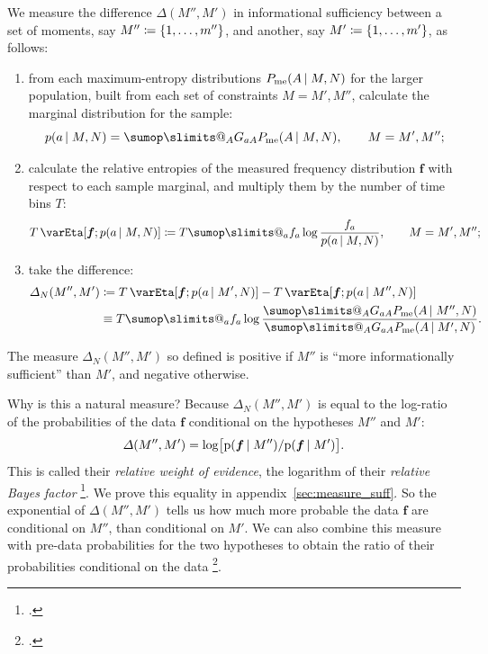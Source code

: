 \documentclass[\ifafour a4paper,12pt,\else a5paper,10pt,\fi%
onecolumn,oneside,article,%
british%
]{memoir}
\makeatletter
\theoremstyle{remark}
\theoremstyle{innote}
\def\sum{\DOTSI\sumop\slimits@}
\newcommand*{\citep}{\footcites}
\newcommand*{\defd}{\coloneqq}
\DeclarePairedDelimiter\set{\{}{\}}
\newcommand*{\pf}{\mathrm{p}}%
\renewcommand*{\|}{\nonscript\,\vert\nonscript\;\mathopen{}}
\newcommand*{\sect}{\S}%
\newcommand*{\chap}{ch.}%
\newcommand*{\chaps}{chs}%
\newcommand*{\cf}{{cf.}}
\newcommand*{\yG}{G}
\newcommand*{\yAv}{A}
\newcommand*{\yav}{a}
\newcommand*{\yff}{f}
\newcommand*{\yf}{\bm{\yff}}
\newcommand*{\ya}{\yav}%
\newcommand*{\yA}{\yAv}%
\newcommand*{\px}{P_{\text{me}}}
\newcommand*{\pxx}{p}
\newcommand*{\ydi}{\varDelta}
\newcommand*{\sh}{\mathrm{\varEta}}
\makeatother
\begin{document}
We measure the difference $\ydi(M'',M')$ in informational sufficiency
between a set of moments, say $M''\defd\set{1,\dotsc,m''}$, and another, say
$M'\defd \set{1,\dotsc,m'}$, as follows:
\begin{enumerate}[label=(\roman*)]
\item from each maximum-entropy distributions $\px(\yA \| M,N)$ for the larger
  population, built from each set of constraints $M=M',M''$, calculate the
  marginal distribution for the sample:
\begin{equation}
  \label{eq:sample_marginal}
  \pxx(\ya \| M, N) = \sum_{\yA}\yG_{\ya \yA}\px(\yA \| M,N),
  \qquad M=M',M'';
\end{equation}
\item calculate the relative entropies of the measured frequency
  distribution $\yf$ with respect to each sample marginal, and multiply
  them by the number of time bins $T$:
  \begin{equation}
    \label{eq:relentropy_T}
    T\,\sh[\yf; \pxx(\ya \| M,N)] \defd
    T  \sum_{\ya} \yff_{\ya} \log\frac{\yff_{\ya}}{\pxx(\ya \| M,N)},
    \qquad M=M',M'';    
  \end{equation}
\item take the difference: 
\begin{equation}
  \label{eq:measure_suffic}
  \begin{split}
  \ydi_{N}(M'',M') &\defd
  T \,\sh[\yf; \pxx(\ya \| M',N)]
  -
  T \,\sh[\yf; \pxx(\ya \| M'',N)]
  \\ &\equiv
T  \sum_{\ya} \yff_{\ya} \log\frac{
  \sum_{\yA}\yG_{\ya\yA}\px(\yA \| M'',N)}{
  \sum_{\yA}\yG_{\ya\yA}\px(\yA \| M',N)}.
\end{split}
\end{equation}
\end{enumerate}
The measure $\ydi_{N}(M'',M')$ so defined is positive if $M''$ is \enquote{more
  informationally sufficient} than $M'$, and negative otherwise.

Why is this a natural measure? Because $\ydi_{N}(M'',M')$ is equal to the
log-ratio of the probabilities of the data $\yf$ conditional on the
hypotheses $M''$ and $M'$:
\begin{equation}
  \label{eq:bayes_factor}
  \ydi(M'',M') =
  \log\bigl[\pf(\yf \| M'')/
  \pf(\yf \| M')\bigr].
\end{equation}
This is called their \emph{relative weight of evidence}, the logarithm of
their \emph{relative Bayes factor}
\citep[\chap~6]{good1950}{good1975,good1981,good1985,good1983}[\sect~1.4]{osteyeeetal1974}{mackay1992,kassetal1995}[see
also][p.~421]{jeffreys1936}[\chaps~V, VI, A]{jeffreys1939_r1983}. We prove
this equality in appendix~\ref{sec:measure_suff}. So the exponential of
$\ydi(M'',M')$ tells us how much more probable the data $\yf$ are
conditional on $M''$, than conditional on $M'$. We can also combine this
measure with pre-data probabilities for the two hypotheses to obtain the
ratio of their probabilities conditional on the data
\citep[\cf][]{bretthorst2013}.
\end{document}
